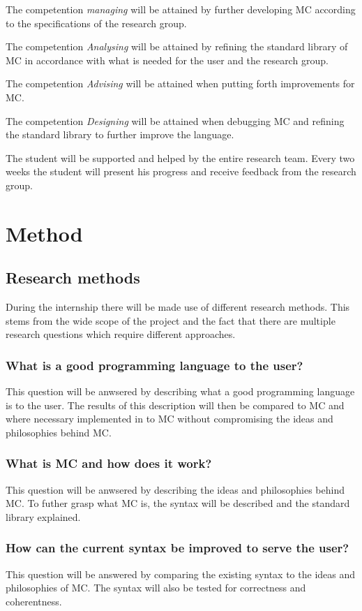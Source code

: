 The competention \emph{managing} will be attained by further developing MC according to the specifications of the research group.

The competention \emph{Analysing} will be attained by refining the standard library of MC in accordance with what is needed for the user and the research group.

The competention \emph{Advising} will be attained when putting forth improvements for MC.

The competention \emph{Designing} will be attained when debugging MC and refining the standard library to further improve the language.

The student will be supported and helped by the entire research team.
Every two weeks the student will present his progress and receive feedback from the research group.


\section{Method}\label{ch:methodmandate}
\subsection{Research methods}
During the internship there will be made use of different research methods.
This stems from the wide scope of the project and the fact that there are multiple research questions which require different approaches.

\subsubsection{What is a good programming language to the user?}
This question will be anwsered by describing what a good programming language is to the user.
The results of this description will then be compared to MC and where necessary implemented in to MC without compromising the ideas and philosophies behind MC.

\subsubsection{What is MC and how does it work?}
This question will be anwsered by describing the ideas and philosophies behind MC.
To futher grasp what MC is, the syntax will be described and the standard library explained.

\subsubsection{How can the current syntax be improved to serve the user?}
This question will be answered by comparing the existing syntax to the ideas and philosophies of MC.
The syntax will also be tested for correctness and coherentness.

